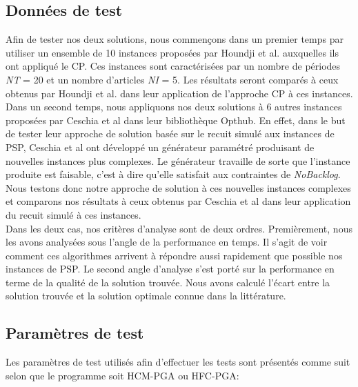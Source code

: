 	\subsection*{Données de test}
Afin de tester nos deux solutions, nous commençons dans un premier temps par utiliser un ensemble de 10 instances proposées par Houndji et al. auxquelles ils ont appliqué le CP. Ces instances sont caractérisées par un nombre de périodes \emph{NT} = 20 et un nombre d'articles \emph{NI} = 5. Les résultats seront comparés à ceux obtenus par Houndji et al. dans leur application de l'approche CP à ces instances. \\
		\hspace*{.5cm} Dans un second temps, nous appliquons nos deux solutions à 6 autres instances proposées par Ceschia et al \cite{ceschia} dans leur bibliothèque Opthub. En effet, dans le but de tester leur approche de solution basée sur le recuit simulé aux instances de PSP, Ceschia et al ont  développé un générateur paramétré produisant de nouvelles instances plus complexes. Le générateur travaille de sorte que l'instance produite est faisable, c'est à dire qu'elle satisfait aux contraintes de \emph{NoBacklog}. Nous testons donc notre approche de solution à ces nouvelles instances complexes et comparons nos résultats à ceux obtenus par Ceschia et al dans leur application du recuit simulé à ces instances. \\
		\hspace*{.5cm} Dans les deux cas, nos critères d'analyse sont de deux ordres. Premièrement, nous les avons analysées sous l'angle de la performance en temps. Il s'agit de voir comment ces algorithmes arrivent à répondre aussi rapidement que possible nos instances de PSP.  Le second angle d'analyse s'est porté sur la performance en terme de la qualité de la solution trouvée. Nous avons calculé l'écart entre la solution trouvée et la solution optimale connue dans la littérature.
		
		\subsection*{Paramètres de test}
		Les paramètres de test utilisés afin d'effectuer les tests sont présentés comme suit selon que le programme soit HCM-PGA ou HFC-PGA:

